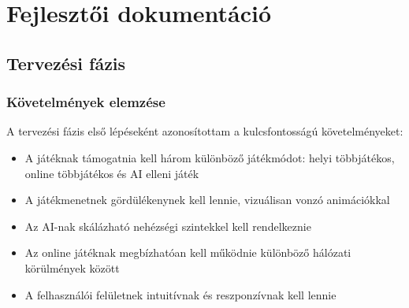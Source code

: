 \chapter{Fejlesztői dokumentáció}
\label{ch:impl}
\section{Tervezési fázis}
\subsection{Követelmények elemzése}
A tervezési fázis első lépéseként azonosítottam a kulcsfontosságú követelményeket:
\begin{itemize}
	\item A játéknak támogatnia kell három különböző játékmódot: helyi többjátékos, online többjátékos és AI elleni játék
	\item A játékmenetnek gördülékenynek kell lennie, vizuálisan vonzó animációkkal
	\item Az AI-nak skálázható nehézségi szintekkel kell rendelkeznie
	\item Az online játéknak megbízhatóan kell működnie különböző hálózati körülmények között
	\item A felhasználói felületnek intuitívnak és reszponzívnak kell lennie
\end{itemize}
